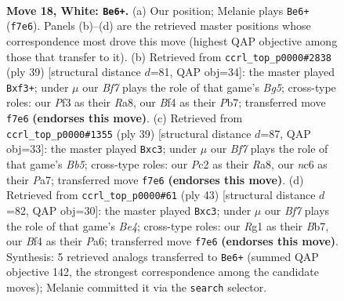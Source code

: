 \documentclass[11pt]{article}
\begin{document}
\clearpage

\begin{figure}[p]\centering
\begin{subfigure}{0.46\textwidth}\centering
\resizebox{\linewidth}{!}{%
\newchessgame
\chessboard[
  setfen={2kr2r1/1pp1pB1p/1nn3p1/p7/5B1P/N4P2/PbP1KP2/R5R1 w - - 0 18},
  showmover=false,
  pgfstyle=straightmove, color=movearrow, markmove={f7-e6}
]}
\caption{}
\end{subfigure}\hfill
\begin{subfigure}{0.46\textwidth}\centering
\resizebox{\linewidth}{!}{%
\newchessgame
\chessboard[
  setfen={r5k1/pp3ppp/1b5r/8/6b1/1N2PBP1/PP1B1P1P/R4R1K b - - 0 20},
  showmover=false,
  pgfstyle=straightmove, color=movearrow, markmove={g4-f3}
]}
\caption{}
\end{subfigure}
\\[4pt]
\begin{subfigure}{0.46\textwidth}\centering
\resizebox{\linewidth}{!}{%
\newchessgame
\chessboard[
  setfen={r1kr4/ppp2pp1/2p5/4P3/1bbN2P1/1PN1R3/P1P2P2/3R2K1 b - - 0 20},
  showmover=false,
  pgfstyle=straightmove, color=movearrow, markmove={b4-c3}
]}
\caption{}
\end{subfigure}\hfill
\begin{subfigure}{0.46\textwidth}\centering
\resizebox{\linewidth}{!}{%
\newchessgame
\chessboard[
  setfen={3r1rk1/1b3p2/pp4p1/3Pb2p/8/1PN3P1/P4PNP/2RR2K1 b - - 2 22},
  showmover=false,
  pgfstyle=straightmove, color=movearrow, markmove={e5-c3}
]}
\caption{}
\end{subfigure}
\caption{\textbf{Move 18, White: \texttt{Be6+}.} (a) Our position; Melanie plays \texttt{Be6+} (\texttt{f7e6}). Panels (b)--(d) are the retrieved master positions whose correspondence most drove this move (highest QAP objective among those that transfer to it). (b) Retrieved from \texttt{ccrl\_top\_p0000\#2838} (ply 39) [structural distance $d$=81, QAP obj=34]: the master played \texttt{Bxf3+}; under $\mu$ our \emph{Bf7} plays the role of that game's \emph{Bg5}; cross-type roles: our \emph{P}f3 as their \emph{R}a8, our \emph{B}f4 as their \emph{P}b7; transferred move \texttt{f7e6} \textbf{(endorses this move)}. (c) Retrieved from \texttt{ccrl\_top\_p0000\#1355} (ply 39) [structural distance $d$=87, QAP obj=33]: the master played \texttt{Bxc3}; under $\mu$ our \emph{Bf7} plays the role of that game's \emph{Bb5}; cross-type roles: our \emph{P}c2 as their \emph{R}a8, our \emph{n}c6 as their \emph{P}a7; transferred move \texttt{f7e6} \textbf{(endorses this move)}. (d) Retrieved from \texttt{ccrl\_top\_p0000\#61} (ply 43) [structural distance $d$=82, QAP obj=30]: the master played \texttt{Bxc3}; under $\mu$ our \emph{Bf7} plays the role of that game's \emph{Be4}; cross-type roles: our \emph{R}g1 as their \emph{B}b7, our \emph{B}f4 as their \emph{P}a6; transferred move \texttt{f7e6} \textbf{(endorses this move)}. Synthesis: 5 retrieved analogs transferred to \texttt{Be6+} (summed QAP objective 142, the strongest correspondence among the candidate moves); Melanie committed it via the \texttt{search} selector.}
\label{fig:thought-m34}
\end{figure}
\end{document}
